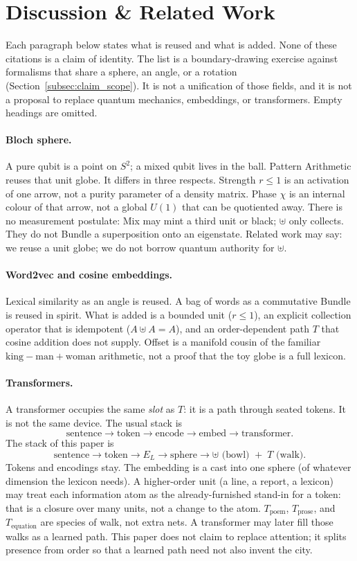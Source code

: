 \documentclass[12pt, a4paper]{article}
\begin{document}
\section{Discussion \& Related Work}
\label{sec:related}

Each paragraph below states what is reused and what is added. None of
these citations is a claim of identity. The list is a
boundary-drawing exercise against formalisms that share a sphere, an
angle, or a rotation
(Section~\ref{subsec:claim_scope}). It is not a unification of those
fields, and it is not a proposal to replace quantum mechanics,
embeddings, or transformers. Empty headings are omitted.

\paragraph{Bloch sphere.}
A pure qubit is a point on $S^2$; a mixed qubit lives in the ball.
Pattern Arithmetic reuses that unit globe. It differs in three
respects. Strength $r\le 1$ is an activation of one arrow, not a purity
parameter of a density matrix. Phase $\chi$ is an internal colour of
that arrow, not a global $U(1)$ that can be quotiented away. There is
no measurement postulate: Mix may mint a third unit or black; $\uplus$
only collects. They do not Bundle a superposition onto an eigenstate. Related work
may say: we reuse a unit globe; we do not borrow quantum authority for
$\uplus$.

\paragraph{Word2vec and cosine embeddings.}
Lexical similarity as an angle is reused. A bag of words as a
commutative Bundle is reused in spirit. What is added is a bounded unit
($r\le 1$), an explicit collection operator that is idempotent
($A\uplus A=A$), and an order-dependent path $T$ that cosine addition
does not supply. Offset is a manifold cousin of the familiar
$\mathrm{king}-\mathrm{man}+\mathrm{woman}$ arithmetic, not a proof
that the toy globe is a full lexicon.

\paragraph{Transformers.}
A transformer occupies the same \emph{slot} as $T$: it is a path
through seated tokens. It is not the same device. The usual stack is
\[
\text{sentence}\to\text{token}\to\text{encode}\to\text{embed}\to\text{transformer}.
\]
The stack of this paper is
\[
\text{sentence}\to\text{token}\to E_L\to\text{sphere}\to
\uplus\text{ (bowl) }+\; T\text{ (walk)}.
\]
Tokens and encodings stay. The embedding is a cast into one sphere
(of whatever dimension the lexicon needs). A higher-order unit (a
line, a report, a lexicon) may treat each information atom as the
already-furnished stand-in for a token: that is a closure over many
units, not a change to the atom. $T_{\mathrm{poem}}$,
$T_{\mathrm{prose}}$, and $T_{\mathrm{equation}}$ are species of
walk, not extra nets. A transformer may later fill those walks as a
learned path. This paper does not claim to replace attention; it
splits presence from order so that a learned path need not also
invent the city.
\end{document}

